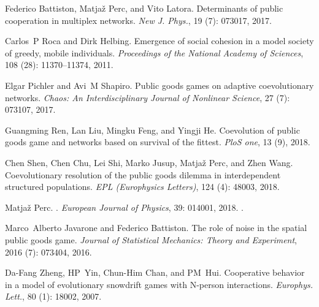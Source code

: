Federico Battiston, Matja{\v z} Perc, and Vito Latora.
\newblock Determinants of public cooperation in multiplex networks.
\newblock \emph{New J. Phys.}, 19 (7): 073017,
2017{}.

Carlos~P Roca and Dirk Helbing.
\newblock Emergence of social cohesion in a model society of greedy, mobile
individuals.
\newblock \emph{Proceedings of the National Academy of Sciences}, 108
(28): 11370--11374, 2011.

Elgar Pichler and Avi~M Shapiro.
\newblock Public goods games on adaptive coevolutionary networks.
\newblock \emph{Chaos: An Interdisciplinary Journal of Nonlinear Science},
27 (7): 073107, 2017.

Guangming Ren, Lan Liu, Mingku Feng, and Yingji He.
\newblock Coevolution of public goods game and networks based on survival of
the fittest.
\newblock \emph{PloS one}, 13 (9), 2018.

Chen Shen, Chen Chu, Lei Shi, Marko Jusup, Matja{\v{z}} Perc, and Zhen Wang.
\newblock Coevolutionary resolution of the public goods dilemma in
interdependent structured populations.
\newblock \emph{EPL (Europhysics Letters)}, 124 (4): 48003,
2018{}.

Matja{\v z} Perc.
.
\newblock \emph{European Journal of Physics}, 39: 014001, 2018.
\newblock {}.

Marco~Alberto Javarone and Federico Battiston.
\newblock The role of noise in the spatial public goods game.
\newblock \emph{Journal of Statistical Mechanics: Theory and Experiment},
2016 (7): 073404, 2016.

Da-Fang Zheng, HP~Yin, Chun-Him Chan, and PM~Hui.
\newblock Cooperative behavior in a model of evolutionary snowdrift games with
{{N}}-person interactions.
\newblock \emph{Europhys. Lett.}, 80 (1): 18002, 2007.

